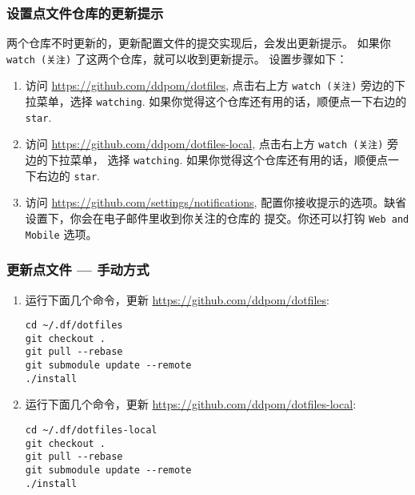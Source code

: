 \documentclass[
    11pt,
    cite=authoryear,
    device=normal,
    lang=cn,
    mode=simple,
    result=answer,
    toc=onecol,
]{elegantbook_sierxue}
\begin{document}
\subsubsection{设置点文件仓库的更新提示}%
\label{ssub:vbox-guest-ganx-conf-update-notification}

两个仓库不时更新的，更新配置文件的提交实现后，会发出更新提示。
如果你 \lstinline{watch (关注)} 了这两个仓库，就可以收到更新提示。
设置步骤如下：
\begin{enumerate}
    \item 访问 \href{https://github.com/ddpom/dotfiles}
        {https://github.com/ddpom/dotfiles}, 点击右上方
        \lstinline{watch (关注)} 旁边的下拉菜单，选择 \lstinline{watching}.
        如果你觉得这个仓库还有用的话，顺便点一下右边的 \lstinline{star}.
    \item 访问 \href{https://github.com/ddpom/dotfiles-local}
        {https://github.com/ddpom/dotfiles-local},
        点击右上方 \lstinline{watch (关注)} 旁边的下拉菜单，
        选择 \lstinline{watching}.
        如果你觉得这个仓库还有用的话，顺便点一下右边的 \lstinline{star}.
    \item 访问 \href{https://github.com/settings/notifications}
        {https://github.com/settings/notifications},
        配置你接收提示的选项。缺省设置下，你会在电子邮件里收到你关注的仓库的
        提交。你还可以打钩 \lstinline{Web and Mobile} 选项。
\end{enumerate}

\subsubsection{更新点文件 --- 手动方式}%
\label{ssub:update-dotfiles-manual}

\begin{enumerate}
    \item 运行下面几个命令，更新 \href{https://github.com/ddpom/dotfiles}
        {https://github.com/ddpom/dotfiles}:
\begin{lstlisting}[escapeinside=``]
cd ~/.df/dotfiles
git checkout .
git pull --rebase
git submodule update --remote
./install
\end{lstlisting}
    \item 运行下面几个命令，更新
        \href{https://github.com/ddpom/dotfiles-local}
        {https://github.com/ddpom/dotfiles-local}:
\begin{lstlisting}[escapeinside=``]
cd ~/.df/dotfiles-local
git checkout .
git pull --rebase
git submodule update --remote
./install
\end{lstlisting}
\end{enumerate}
\end{document}
